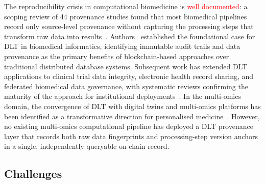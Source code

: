 \documentclass[5p,times,twocolumn]{elsarticle}
\newcommand{\lang}[1]{\textcolor{red}{#1}}
\begin{document}
The reproducibility crisis in computational
biomedicine is \lang{well documented}: a scoping review
of 44 provenance studies found that most biomedical
pipelines record only source-level provenance
without capturing the processing steps that
transform raw data into results~\cite{johns2023data}.
Authors~\cite{kuo2017blockchain} established the
foundational case for DLT in biomedical informatics,
identifying immutable audit trails and data
provenance as the primary benefits of
blockchain-based approaches over traditional
distributed database systems.
Subsequent work has extended DLT applications
to clinical trial data integrity, electronic health
record sharing, and federated biomedical data
governance, with systematic reviews confirming
the maturity of the approach for institutional
deployments~\cite{lacson2024biomedical}.
In the multi-omics domain, the convergence of DLT
with digital twins and multi-omics platforms has
been identified as a transformative direction for
personalised medicine~\cite{mohr2024navigating}.
However, no existing multi-omics computational
pipeline has deployed a DLT provenance layer
that records both raw data fingerprints and
processing-step version anchors in a single,
independently queryable on-chain record.

\subsection{\textbf{Challenges}}
\end{document}
